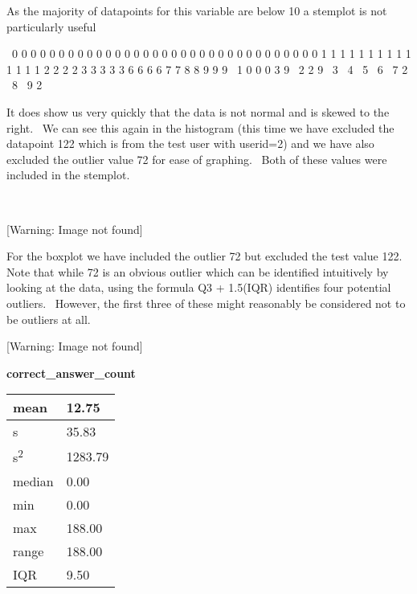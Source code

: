 \documentclass[12pt,twoside]{article}
\begin{document}
As the majority of datapoints for this variable are below 10 a stemplot
is not particularly useful 

~0 {\textbar} 0 0 0 0 0 0 0 0 0 0 0 0 0 0 0 0 0 0 0 0 0 0 0 0 0 0 0 0 0
0 0 0 1 1 1 1 1 1 1 1 1 1 1 1 1 1 2 2 2 2 3 3 3 3 3 6 6 6 6 7 7 8 8 9 9
9\newline
~1 {\textbar} 0 0 0 3 9\newline
~2 {\textbar} 2 9\newline
~3 {\textbar}\newline
~4 {\textbar}\newline
~5 {\textbar}\newline
~6 {\textbar}\newline
~7 {\textbar} 2\newline
~8 {\textbar}\newline
~9 {\textbar} {\textbar} {\textbar} {\textbar}2


\bigskip

It does show us very quickly that the data is not normal and is skewed
to the right.~ We can see this again in the histogram (this time we
have excluded the datapoint 122 which is from the test user with
userid=2) and we have also excluded the outlier value 72 for ease of
graphing.~ Both of these values were included in the stemplot.

~ 

 [Warning: Image not found]  

\newline

For the boxplot we have included the outlier 72 but excluded the test
value 122.~ Note that while 72 is an obvious outlier which can be
identified intuitively by looking at the data, using the formula Q3 +
1.5(IQR) identifies four potential outliers.~ However, the first three
of these might reasonably be considered not to be outliers at all.

 [Warning: Image not found]  

\bigskip

\textbf{correct\_answer\_count} 


\bigskip

\begin{longtable}[l]{|p{1.6712599in}|p{1.7309599in}|}
\hline
mean 
&
12.75 
\\\hline
s 
&
35.83 
\\\hline
s\textsuperscript{2} 
&
1283.79 
\\\hline
median 
&
0.00 
\\\hline
min 
&
0.00 
\\\hline
max 
&
188.00 
\\\hline
range 
&
188.00 
\\\hline
IQR 
&
9.50 
\\\hline
\end{longtable}
\end{document}
